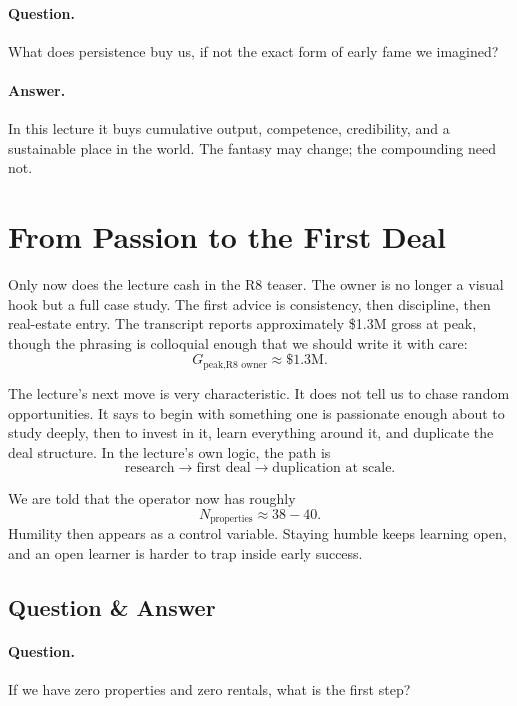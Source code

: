 \paragraph{Question.} What does persistence buy us, if not the exact form of early fame we imagined?

\paragraph{Answer.} In this lecture it buys cumulative output, competence, credibility, and a sustainable place in the world. The fantasy may change; the compounding need not.

\section{From Passion to the First Deal}

Only now does the lecture cash in the R8 teaser. The owner is no longer a visual hook but a full case study. The first advice is consistency, then discipline, then real-estate entry. The transcript reports approximately \$1.3M gross at peak, though the phrasing is colloquial enough that we should write it with care:
\begin{equation}
G_{\text{peak,R8 owner}} \approx \$1.3\text{M}.
\end{equation}

The lecture's next move is very characteristic. It does not tell us to chase random opportunities. It says to begin with something one is passionate enough about to study deeply, then to invest in it, learn everything around it, and duplicate the deal structure. In the lecture's own logic, the path is
\begin{equation}
\text{research} \to \text{first deal} \to \text{duplication at scale}.
\end{equation}

We are told that the operator now has roughly
\begin{equation}
N_{\text{properties}} \approx 38-40.
\end{equation}
Humility then appears as a control variable. Staying humble keeps learning open, and an open learner is harder to trap inside early success.

\subsection{Question \& Answer}

\paragraph{Question.} If we have zero properties and zero rentals, what is the first step?

